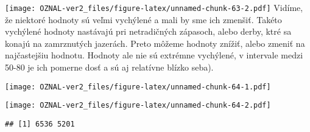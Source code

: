 \documentclass[
]{article}
\newenvironment{Shaded}{\begin{snugshade}}{\end{snugshade}}
\newcommand{\AttributeTok}[1]{\textcolor[rgb]{0.77,0.63,0.00}{#1}}
\newcommand{\ConstantTok}[1]{\textcolor[rgb]{0.00,0.00,0.00}{#1}}
\newcommand{\DecValTok}[1]{\textcolor[rgb]{0.00,0.00,0.81}{#1}}
\newcommand{\FunctionTok}[1]{\textcolor[rgb]{0.00,0.00,0.00}{#1}}
\newcommand{\NormalTok}[1]{#1}
\newcommand{\SpecialCharTok}[1]{\textcolor[rgb]{0.00,0.00,0.00}{#1}}
\newcommand{\StringTok}[1]{\textcolor[rgb]{0.31,0.60,0.02}{#1}}
\begin{document}
\texttt{[image: OZNAL-ver2\_files/figure-latex/unnamed-chunk-63-2.pdf]}
Vidíme, že niektoré hodnoty sú veľmi vychýlené a mali by sme ich
zmenšiť. Takéto vychýlené hodnoty nastávajú pri netradičných zápasoch,
alebo derby, ktré sa konajú na zamrznutých jazerách. Preto môžeme
hodnoty znížiť, alebo zmeniť na najčastejšiu hodnotu. Hodnoty ale nie sú
extrémne vychýlené, v intervale medzi 50-80 je ich pomerne dosť a sú aj
relatívne blízko seba).

\begin{Shaded}
\end{Shaded}

\texttt{[image: OZNAL-ver2\_files/figure-latex/unnamed-chunk-64-1.pdf]}

\begin{Shaded}
\end{Shaded}

\texttt{[image: OZNAL-ver2\_files/figure-latex/unnamed-chunk-64-2.pdf]}

\begin{verbatim}
## [1] 6536 5201
\end{verbatim}

\begin{Shaded}
\end{Shaded}
\end{document}
